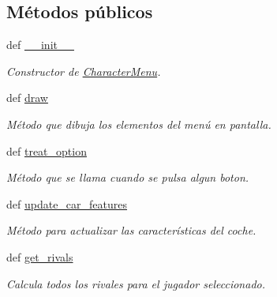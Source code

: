 \subsection*{\-Métodos públicos}
\begin{DoxyCompactItemize}
\item 
def \hyperlink{classengine_1_1charactermenu_1_1CharacterMenu_aca7691e8e40c17ff8a08a3f3221238ac}{\-\_\-\-\_\-init\-\_\-\-\_\-}
\begin{DoxyCompactList}\small\item\em \-Constructor de \hyperlink{classengine_1_1charactermenu_1_1CharacterMenu}{\-Character\-Menu}. \end{DoxyCompactList}\item 
\hypertarget{classengine_1_1charactermenu_1_1CharacterMenu_a0707e4c6ee419ea0e7dab0472e1e5158}{
def \hyperlink{classengine_1_1charactermenu_1_1CharacterMenu_a0707e4c6ee419ea0e7dab0472e1e5158}{draw}}
\label{classengine_1_1charactermenu_1_1CharacterMenu_a0707e4c6ee419ea0e7dab0472e1e5158}

\begin{DoxyCompactList}\small\item\em \-Método que dibuja los elementos del menú en pantalla. \end{DoxyCompactList}\item 
\hypertarget{classengine_1_1charactermenu_1_1CharacterMenu_a56e81b26f6c157fe4f65f50fe35e6416}{
def \hyperlink{classengine_1_1charactermenu_1_1CharacterMenu_a56e81b26f6c157fe4f65f50fe35e6416}{treat\-\_\-option}}
\label{classengine_1_1charactermenu_1_1CharacterMenu_a56e81b26f6c157fe4f65f50fe35e6416}

\begin{DoxyCompactList}\small\item\em \-Método que se llama cuando se pulsa algun boton. \end{DoxyCompactList}\item 
\hypertarget{classengine_1_1charactermenu_1_1CharacterMenu_ab62329ed3c3439dbd524079c3c56236b}{
def \hyperlink{classengine_1_1charactermenu_1_1CharacterMenu_ab62329ed3c3439dbd524079c3c56236b}{update\-\_\-car\-\_\-features}}
\label{classengine_1_1charactermenu_1_1CharacterMenu_ab62329ed3c3439dbd524079c3c56236b}

\begin{DoxyCompactList}\small\item\em \-Método para actualizar las características del coche. \end{DoxyCompactList}\item 
def \hyperlink{classengine_1_1charactermenu_1_1CharacterMenu_a1d3b6f2180882a3dd45138dbba0e5f55}{get\-\_\-rivals}
\begin{DoxyCompactList}\small\item\em \-Calcula todos los rivales para el jugador seleccionado. \end{DoxyCompactList}\end{DoxyCompactItemize}
